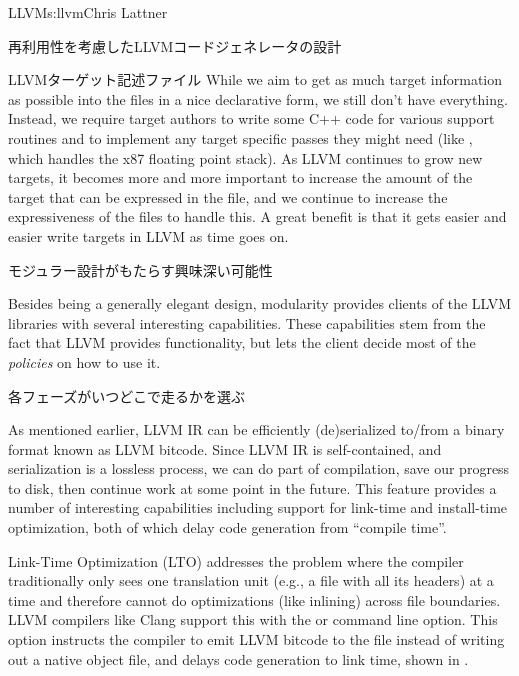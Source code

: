 \begin{aosachapter}{LLVM}{s:llvm}{Chris Lattner}
\begin{aosasect1}{再利用性を考慮したLLVMコードジェネレータの設計}
\begin{aosasect2}{LLVMターゲット記述ファイル}
While we aim to get as much target information as possible into the
 files in a nice declarative form, we still don't have
everything. Instead, we require target authors to write some C++ code
for various support routines and to implement any target specific
passes they might need (like , which
handles the x87 floating point stack).  As LLVM continues to grow new
targets, it becomes more and more important to increase the amount of
the target that can be expressed in the  file, and we
continue to increase the expressiveness of the  files to
handle this.  A great benefit is that it gets easier and easier write
targets in LLVM as time goes on.

\end{aosasect2}

\end{aosasect1}

\begin{aosasect1}{モジュラー設計がもたらす興味深い可能性}

Besides being a generally elegant design, modularity provides clients
of the LLVM libraries with several interesting capabilities. These
capabilities stem from the fact that LLVM provides functionality, but
lets the client decide most of the \emph{policies} on how to use it.

\begin{aosasect2}{各フェーズがいつどこで走るかを選ぶ}

As mentioned earlier, LLVM IR can be efficiently (de)serialized
to/from a binary format known as LLVM bitcode.  Since LLVM IR is
self-contained, and serialization is a lossless process, we can do
part of compilation, save our progress to disk, then continue work at
some point in the future.  This feature provides a number of
interesting capabilities including support for link-time and
install-time optimization, both of which delay code generation from
``compile time''.

Link-Time Optimization (LTO) addresses the problem where the compiler
traditionally only sees one translation unit (e.g., a  file
with all its headers) at a time and therefore cannot do optimizations
(like inlining) across file boundaries.  LLVM compilers like Clang
support this with the  or  command line option.
This option instructs the compiler to emit LLVM bitcode to the
file instead of writing out a native object file, and delays
code generation to link time, shown in .


\end{aosasect2}
\end{aosasect1}
\end{aosachapter}
